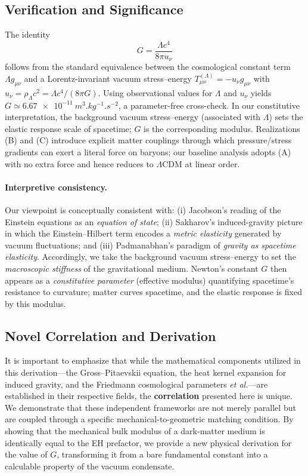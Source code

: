\documentclass[11pt,a4paper]{article}
\begin{document}
\subsection{Verification and Significance}
The identity
\begin{equation}
G=\frac{\Lambda c^4}{8\pi u_\nu}
\end{equation}
follows from the standard equivalence between the cosmological constant term
$\Lambda g_{\mu\nu}$ and a Lorentz-invariant vacuum stress--energy
$T^{(\Lambda)}_{\mu\nu}=-u_\nu g_{\mu\nu}$ with $u_\nu=\rho_\Lambda c^2=\Lambda c^4/(8\pi G)$.
Using observational values for $\Lambda$ and $u_\nu$ yields
$G\simeq \SI{6.67e-11}{m^3.kg^{-1}.s^{-2}}$, a parameter-free cross-check.\cite{Jacobson1995}
In our constitutive interpretation, the background vacuum stress--energy (associated with $\Lambda$)
sets the elastic response scale of spacetime; $G$ is the corresponding modulus.
Realizations (B) and (C) introduce explicit matter couplings through which pressure/stress gradients
can exert a literal force on baryons; our baseline analysis adopts (A) with no extra force and hence
reduces to $\Lambda$CDM at linear order.\cite{Gubitosi2013,BerezhianiKhoury2015}

\paragraph{Interpretive consistency.}
Our viewpoint is conceptually consistent with: (i) Jacobson’s reading of the Einstein equations
as an \emph{equation of state}; (ii) Sakharov’s induced-gravity picture in which the
Einstein--Hilbert term encodes a \emph{metric elasticity} generated by vacuum fluctuations; and
(iii) Padmanabhan’s paradigm of \emph{gravity as spacetime elasticity}.
Accordingly, we take the background vacuum stress--energy to set the \emph{macroscopic stiffness}
of the gravitational medium. Newton’s constant $G$ then appears as a \emph{constitutive parameter}
(effective modulus) quantifying spacetime’s resistance to curvature; matter curves spacetime, and
the elastic response is fixed by this modulus.\cite{Jacobson1995,Sakharov1967,Padmanabhan2004}

\subsection{Novel Correlation and Derivation}
It is important to emphasize that while the mathematical components utilized in this derivation—the Gross--Pitaevskii equation, the heat kernel expansion for induced gravity, and the Friedmann cosmological parameters \textit{et al.}—are established in their respective fields, the \textbf{correlation} presented here is unique. We demonstrate that these independent frameworks are not merely parallel but are coupled through a specific mechanical-to-geometric matching condition. By showing that the mechanical bulk modulus of a dark-matter medium is identically equal to the EH prefactor, we provide a new physical derivation for the value of $G$, transforming it from a bare fundamental constant into a calculable property of the vacuum condensate.
\end{document}
